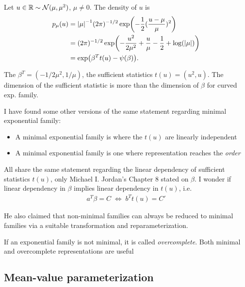 \begin{example}
	Let $u \in \mathbb{R} \sim \mathcal{N}(\mu, \mu^2)$, $\mu \not=0$. The density of $u$ is
	\begin{align*}
		p_\mu(u)
		 & = \abs{\mu}^{-1}(2\pi)^{-1/2} \exp(-\frac{1}{2}(\frac{u-\mu}{\mu})^2)                     \\
		 & = (2\pi)^{-1/2} \exp(-\frac{u^2}{2\mu^2} + \frac{u}{\mu} - \frac{1}{2} + \log(\abs{\mu})) \\
		 & = \exp(\beta^T t(u) - \psi(\beta)).
	\end{align*}

	The $\beta^T = (-1/2\mu^2, 1/\mu)$,
	the sufficient statistics $t(u) = (u^2, u)$.
	The dimension of the sufficient statistic is more than the dimension of $\beta$ for curved exp. family.
\end{example}




I have found some other versions of the same statement regarding minimal exponential family:
\begin{itemize}
	\item A minimal exponential family is where the $t(u)$ are linearly independent
	\item A minimal exponential family is one where representation reaches the \emph{order}
\end{itemize}

All share the same statement regarding the linear dependency of sufficient statistics $t(u)$,
only Michael I. Jordan's Chapter 8 stated on $\beta$.
I wonder if linear dependency in $\beta$ implies linear dependency in $t(u)$, i.e.
\begin{align*}
	a^T \beta = C \; \Leftrightarrow \; b^Tt(u) = C'
\end{align*}

He also claimed that non-minimal families can always be reduced to minimal families
via a suitable transformation and reparameterization.

If an exponential family is not minimal, it is
called \emph{overcomplete}. Both minimal and overcomplete representations are useful



\subsection{Mean-value parameterization}

